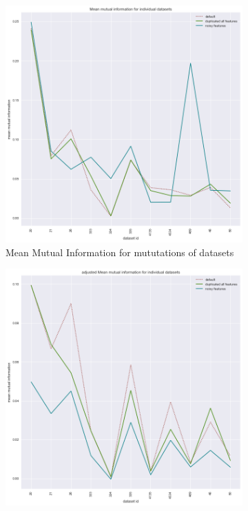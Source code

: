 \documentclass[a4paper,10pt]{article}
\begin{document}
\begin{figure}[H]
	\centering
	\begin{subfigure}[b]{0.45\textwidth}
		\includegraphics[width=\textwidth]{images/MeanMutualInformation.png}
		\caption{Mean Mutual Information for mututations of datasets}
		\label{fig:MMI}
	\end{subfigure}
	\begin{subfigure}[b]{0.45\textwidth}
		\includegraphics[width=\textwidth]{images/adjustedMeanMutualInformation.png}

\end{subfigure}
\end{figure}
\end{document}
